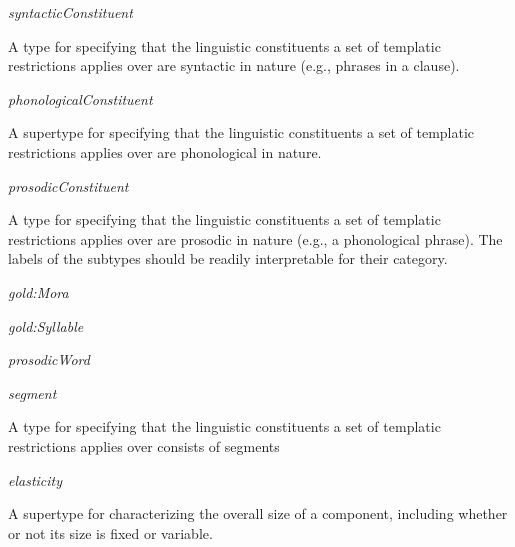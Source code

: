 \begin{ontologytop}
\begin{classlist}
\begin{classlist}
		\item \emph{syntacticConstituent}
		\hspace{1em}\parbox[t]{\linegoal}{\footnotesize A type for specifying that the linguistic constituents a set of templatic restrictions applies over are syntactic in nature (e.g., phrases in a clause).}


		\end{classlist}

	\item \emph{phonologicalConstituent}
	\hspace{1em}\parbox[t]{\linegoal}{\footnotesize A supertype for specifying that the linguistic constituents a set of templatic restrictions applies over are phonological in nature.}


		\begin{classlist}

		\item \emph{prosodicConstituent}
		\hspace{1em}\parbox[t]{\linegoal}{\footnotesize A type for specifying that the linguistic constituents a set of templatic restrictions applies over are prosodic in nature (e.g., a phonological phrase). The labels of the subtypes should be readily interpretable for their category.}


			\begin{classlist}

			\item \emph{gold:Mora}


			\item \emph{gold:Syllable}


			\item \emph{prosodicWord}


			\end{classlist}

		\item \emph{segment}
		\hspace{1em}\parbox[t]{\linegoal}{\footnotesize A type for specifying that the linguistic constituents a set of templatic restrictions applies over consists of segments}


		\end{classlist}

	\end{classlist}

\item \emph{elasticity}
\hspace{1em}\parbox[t]{\linegoal}{\footnotesize A supertype for characterizing the overall size of a component, including whether or not its size is fixed or variable.}



\end{ontologytop}
